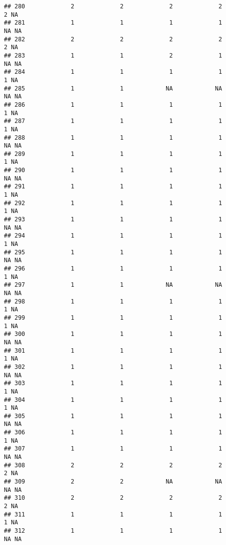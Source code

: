 \documentclass[
]{article}
\begin{document}
\begin{verbatim}
## 280             2             2             2             2             2 NA
## 281             1             1             1             1            NA NA
## 282             2             2             2             2             2 NA
## 283             1             1             2             1            NA NA
## 284             1             1             1             1             1 NA
## 285             1             1            NA            NA            NA NA
## 286             1             1             1             1             1 NA
## 287             1             1             1             1             1 NA
## 288             1             1             1             1            NA NA
## 289             1             1             1             1             1 NA
## 290             1             1             1             1            NA NA
## 291             1             1             1             1             1 NA
## 292             1             1             1             1             1 NA
## 293             1             1             1             1            NA NA
## 294             1             1             1             1             1 NA
## 295             1             1             1             1            NA NA
## 296             1             1             1             1             1 NA
## 297             1             1            NA            NA            NA NA
## 298             1             1             1             1             1 NA
## 299             1             1             1             1             1 NA
## 300             1             1             1             1            NA NA
## 301             1             1             1             1             1 NA
## 302             1             1             1             1            NA NA
## 303             1             1             1             1             1 NA
## 304             1             1             1             1             1 NA
## 305             1             1             1             1            NA NA
## 306             1             1             1             1             1 NA
## 307             1             1             1             1            NA NA
## 308             2             2             2             2             2 NA
## 309             2             2            NA            NA            NA NA
## 310             2             2             2             2             2 NA
## 311             1             1             1             1             1 NA
## 312             1             1             1             1            NA NA

\end{verbatim}
\end{document}
